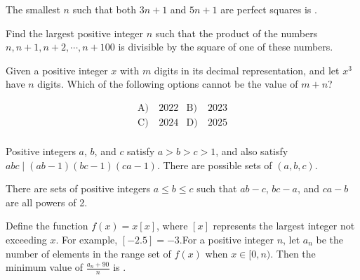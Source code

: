 \begin{problem}\label{Alg6}
	
The smallest $n$ such that both $3n+1$ and $5n+1$ are perfect squares is \underline{\hspace{2cm}}.
\end{problem}




\begin{problem}\label{Alg7}
	
Find the largest positive integer $n$ such that the product of the numbers $n, n+1, n+2,\cdots, n+100$ is divisible by the square of one of these numbers.
	
\end{problem}



\begin{problem}\label{Alg8}
	Given a positive integer $x$ with $m$ digits in its decimal representation, and let $x^3$ have $n$ digits. Which of the following options cannot be the value of $m + n$?

\begin{align*}
	\text{A)}\ & 2022 &
	\text{B)}\ & 2023\\
	\text{C)}\ &  2024 &
	\text{D)}\ & 2025\\
\end{align*} 
	
\end{problem}





\begin{problem}\label{Alg9}
	
Positive integers $a$, $b$, and $c$ satisfy $a > b > c > 1$, and also satisfy $abc \mid (ab - 1)(bc - 1)(ca - 1)$. There are \underline{\hspace{2cm}} possible sets of $(a, b, c)$.
\end{problem}



\begin{problem}\label{Alg10}
There are \underline{\hspace{2cm}} sets of positive integers $a \leq b \leq c$ such that $ab - c$, $bc - a$, and $ca - b$ are all powers of 2.
	
\end{problem}

\begin{problem}\label{Alg11}
	
Define the function $f(x) =x[x]$, where $[x]$ represents the largest integer not exceeding $x$. For example, $[-2.5] = -3$.For a positive integer $n$, let $a_n$ be the number of elements in the range set of $f(x)$ when $x \in [0,n)$. Then the minimum value of $\frac{a_n + 90}{n}$ is \underline{\hspace{2cm}}.
	
\end{problem}



